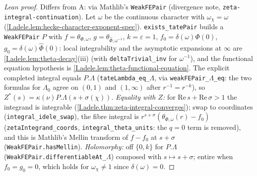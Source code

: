 \begin{proof}[Lean proof]
Differs from A: via Mathlib's \texttt{WeakFEPair} (divergence note, \texttt{zeta-integral-continuation}). Let $\omega$ be the continuous character with $\omega_\chi=\omega$ (\cref{I.adele.lem:hecke-character-exponent-spec}). \texttt{exists\_tatePair} builds a \texttt{WeakFEPair} $P$ with $f=\theta_{\Phi,\omega}$, $g=\theta_{\hat\Phi,\omega^{-1}}$, $k=\varepsilon=1$, $f_0=\delta(\omega)\Phi(0)$, $g_0=\delta(\omega)\hat\Phi(0)$: local integrability and the asymptotic expansions at $\infty$ are \cref{I.adele.lem:theta-decay}(iii) (with \texttt{deltaTrivial\_inv} for $\omega^{-1}$), and the functional equation hypothesis is \cref{I.adele.lem:theta-functional-equation}. The explicit completed integral equals $P.\Lambda$ (\texttt{tateLambda\_eq\_}$\Lambda$, via \texttt{weakFEPair\_}$\Lambda$\texttt{\_eq}: the two formulas for $\Lambda_0$ agree on $(0,1)$ and $(1,\infty)$ after $r^{-1}=r^{-k}$), so $Z^*(s)=\kappa(\nu)P.\Lambda(s+\sigma(\chi))$. \emph{Equality with $Z$:} for $\mathrm{Re}\,s+\mathrm{Re}\,\sigma>1$ the integrand is integrable (\cref{I.adele.thm:zeta-integral-converges}); swap to coordinates (\texttt{integral\_idele\_swap}), the fibre integral is $r^{s+\sigma}(\theta_{\Phi,\omega}(r)-f_0)$ (\texttt{zetaIntegrand\_coords}, \texttt{integral\_theta\_units}: the $q=0$ term is removed), and this is Mathlib's Mellin transform of $f-f_0$ at $s+\sigma$ (\texttt{WeakFEPair.hasMellin}). \emph{Holomorphy:} off $\{0,k\}$ for $P.\Lambda$ (\texttt{WeakFEPair.differentiableAt\_}$\Lambda$) composed with $s\mapsto s+\sigma$; entire when $f_0=g_0=0$, which holds for $\omega_\chi\ne1$ since $\delta(\omega)=0$.
\end{proof}

